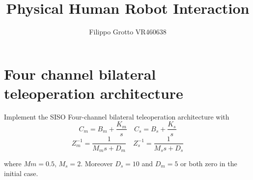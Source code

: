 \documentclass[a4paper,12pt]{article}
\begin{document}
\author{Filippo Grotto VR460638}

\title{Physical Human Robot Interaction}

\maketitle
\tableofcontents

\section{Four channel bilateral teleoperation architecture}
Implement the SISO Four-channel bilateral teleoperation architecture with
\[
    C_m = B_m + \frac{K_m}{s} \quad
    C_s = B_s + \frac{K_s}{s}
\]
\[
    Z_m^{-1} = \frac{1}{M_ms + D_m} \quad
    Z_s^{-1} = \frac{1}{M_ss + D_s}
\]

\bigskip
\noindent where $Mm = 0.5$, $M_s = 2$. Moreover $D_s = 10$ and $D_m = 5$ or both zero in the initial case.
\end{document}
